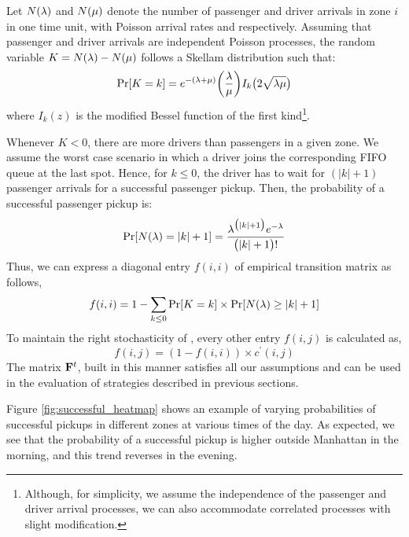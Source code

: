 Let $N(\lambda)$ and $N(\mu)$ denote the number of passenger and driver arrivals in zone $i$ in one time unit, with Poisson arrival rates {\passengerarrivalrate} and {\driverarrivalrate} respectively. Assuming that passenger and driver arrivals are independent Poisson processes, the random variable $K = N(\lambda) - N(\mu)$ follows a Skellam distribution 
such that:
\begin{equation}
\Pr[K=k] = e^{-(\lambda + \mu)} \bigg(\frac{\lambda}{\mu}\bigg) I_k\big(2 \sqrt{\lambda \mu}\big)
\end{equation}
where $I_k(z)$ is the modified Bessel function of the first kind\footnote{Although, for simplicity, we assume the independence of the passenger and driver arrival processes, we can also accommodate correlated processes with slight modification.}.

Whenever %
$K<0$, there are more drivers than passengers in a given zone. We assume the worst case scenario in which a driver joins the corresponding FIFO queue at the last spot. Hence, for $k \leq 0$, the driver has to wait for $(|k| + 1)$ passenger arrivals for a successful passenger pickup. Then, the probability of a successful passenger pickup is:
\begin{equation}
\Pr[N(\lambda) = |k| + 1] = \frac{\lambda^{\big(|k|+1\big)} e^{-\lambda}}{\big(|k| + 1\big)!}
\end{equation}
Thus, we can express a diagonal entry $f(i,i)$ of empirical transition matrix as follows,
\begin{equation}
f(i,i) = 1 - \sum_{k \leq 0} \Pr[K = k] \times \Pr[N(\lambda) \geq |k| + 1]
\end{equation}
To maintain the right stochasticity of {\empiricaltransitionmatrix}, every other entry $f(i,j)$ is calculated as,
\begin{equation}
f(i,j) = (1 - f(i,i)) \times c^\prime(i,j)
\end{equation}
The matrix ${\mathbf{F}}^t$, built in this manner satisfies all our assumptions and can be used in the evaluation of strategies described in previous sections. 

Figure \ref{fig:successful_heatmap} shows an example of varying probabilities of successful pickups in different zones at various times of the day. As expected, we see that the probability of a successful pickup is higher outside Manhattan in the morning, and this trend reverses in the evening.

